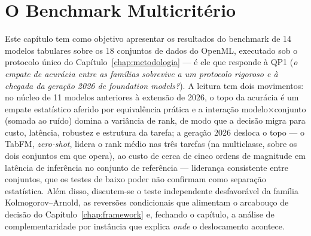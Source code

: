 %
%

\chapter{O Benchmark Multicritério}
\label{chap:benchmark}

Este capítulo tem como objetivo apresentar os resultados do benchmark de
14 modelos tabulares sobre os 18 conjuntos de dados do OpenML, executado
sob o protocolo único do Capítulo~\ref{chap:metodologia} --- é ele que
responde à QP1 (\emph{o empate de acurácia entre as famílias sobrevive
a um protocolo rigoroso e à chegada da geração 2026 de foundation
models?}). A leitura tem
dois movimentos: no núcleo de 11 modelos anteriores à extensão de 2026, o
topo da acurácia é um empate estatístico aferido por equivalência prática
e a interação modelo$\times$conjunto (somada ao ruído) domina a
variância de rank, de modo que a decisão
migra para custo, latência, robustez e estrutura da tarefa; a geração
2026 desloca o topo --- o TabFM, \emph{zero-shot}, lidera o rank
médio nas
três tarefas (na multiclasse, sobre os dois conjuntos em que opera),
ao custo de cerca de cinco ordens de magnitude em latência
de inferência no conjunto de referência --- liderança consistente
entre conjuntos, que os testes
de baixo poder não confirmam como separação estatística. Além disso,
discutem-se o teste independente desfavorável
da família Kolmogorov--Arnold, as reversões condicionais que alimentam o
arcabouço de decisão do Capítulo~\ref{chap:framework} e, fechando o
capítulo, a análise de complementaridade por instância que explica
\emph{onde} o deslocamento acontece.

